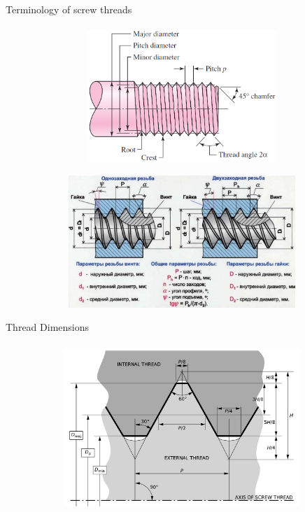 \documentclass[aspectratio=169]{beamer}
\begin{document}
\begin{frame}[t]{Terminology of screw threads}
    \framesubtitle{}
    \begin{figure}[H]
        \begin{subfigure}{0.49\textwidth}
            \centering\includegraphics[height=5cm,width=1\textwidth,keepaspectratio]{screw_threads_terms.png}
            \label{fig:screw_threads_terms.png}
        \end{subfigure}
        \begin{subfigure}{0.49\textwidth}
            \centering\includegraphics[height=5cm,width=1\textwidth,keepaspectratio]{geom_thread_param_rus.jpeg}
            \label{fig:geom_thread_param_rus.jpeg}
        \end{subfigure}
    \end{figure}
\end{frame}

\begin{frame}[t]{Thread Dimensions}
    \framesubtitle{}
    \vspace{-0.6cm}
    \begin{figure}[H]
        \centering\includegraphics[height=6cm,width=1\textwidth,keepaspectratio]{thread_dimensions.png}
        \label{fig:thread_dimensions.png}
    \end{figure}
\end{frame}
\end{document}
